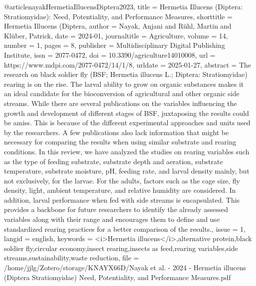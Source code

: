 {{{{@article{nayakHermetiaIllucensDiptera2023,
  title = {Hermetia Illucens ({{Diptera}}: {{Stratiomyidae}}): {{Need}}, {{Potentiality}}, and {{Performance Measures}}},
  shorttitle = {Hermetia Illucens ({{Diptera}}},
  author = {Nayak, Anjani and Rühl, Martin and Klüber, Patrick},
  date = {2024-01},
  journaltitle = {Agriculture},
  volume = {14},
  number = {1},
  pages = {8},
  publisher = {Multidisciplinary Digital Publishing Institute},
  issn = {2077-0472},
  doi = {10.3390/agriculture14010008},
  url = {https://www.mdpi.com/2077-0472/14/1/8},
  urldate = {2025-01-27},
  abstract = {The research on black soldier fly (BSF; Hermetia illucens L.; Diptera: Stratiomyidae) rearing is on the rise. The larval ability to grow on organic substances makes it an ideal candidate for the bioconversion of agricultural and other organic side streams. While there are several publications on the variables influencing the growth and development of different stages of BSF, juxtaposing the results could be amiss. This is because of the different experimental approaches and units used by the researchers. A few publications also lack information that might be necessary for comparing the results when using similar substrate and rearing conditions. In this review, we have analyzed the studies on rearing variables such as the type of feeding substrate, substrate depth and aeration, substrate temperature, substrate moisture, pH, feeding rate, and larval density mainly, but not exclusively, for the larvae. For the adults, factors such as the cage size, fly density, light, ambient temperature, and relative humidity are considered. In addition, larval performance when fed with side streams is encapsulated. This provides a backbone for future researchers to identify the already assessed variables along with their range and encourages them to define and use standardized rearing practices for a better comparison of the results.},
  issue = {1},
  langid = {english},
  keywords = {<i>Hermetia illucens</i>,alternative protein,black soldier fly,circular economy,insect rearing,insects as feed,rearing variables,side streams,sustainability,waste reduction},
  file = {/home/jjlg/Zotero/storage/KNAYX66D/Nayak et al. - 2024 - Hermetia illucens (Diptera Stratiomyidae) Need, Potentiality, and Performance Measures.pdf}
}

}}}}
